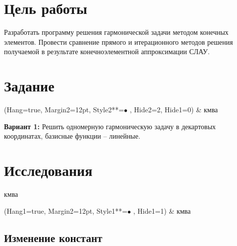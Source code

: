 

\section{Цель работы}

Разработать программу решения гармонической задачи методом конечных элементов. Провести сравнение прямого и итерационного методов решения получаемой в результате конечноэлементной аппроксимации СЛАУ.

\section{Задание}

\begin{easylist}
\ListProperties(Hang=true, Margin2=12pt, Style2**=$\bullet$ , Hide2=2, Hide1=0)
& кмва
\end{easylist}

\textbf{Вариант 1:} Решить одномерную гармоническую задачу в декартовых координатах, базисные функции – линейные.

\section{Исследования}

кмва

\begin{easylist}
\ListProperties(Hang1=true, Margin2=12pt, Style1**=$\bullet$ , Hide1=1)
& кмва
\end{easylist}

\subsection{Изменение констант}

\newcommand{\bigtable}[1]{
\begin{center}
\noindent\pgfplotstabletypeset[
	columns/param/.style={string type, column name={Параметр}},
	columns/los_norm/.style={column name={LOS норма}},
	columns/bsg_norm/.style={column name={BSG норма}},
	columns/los_time/.style={column name={\tcell{LOS\\время}}},
	columns/bsg_time/.style={column name={\tcell{BSG\\время}}},
	columns/los_iter/.style={column name={\tcell{LOS\\итераций}}},
	columns/bsg_iter/.style={column name={\tcell{BSG\\итераций}}, column type/.add={}{|},},
	every head row/.style={before row=\hline,after row=\hline\hline}, 
	every last row/.style={after row=\hline},
	column type/.add={|}{},
	col sep=tab,
]{#1.txt}
\end{center}
}

